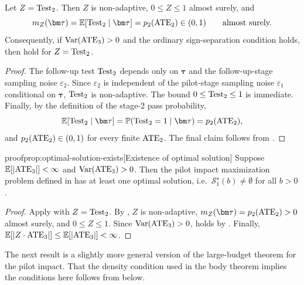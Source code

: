 \begin{lemma}
  \label{lem:test-two-satisfies-weighted-conditions-appendix}
  Let $Z=\operatorname{Test}_2$.
  Then $Z$ is non-adaptive, $0\le Z\le1$ almost surely, and
  \[
    m_Z(\bm\tau)
    =
    \E[\Test_2\mid\bm\tau]
    =
    p_2(\ATE_2)
    \in(0,1)
    \qquad\text{almost surely.}
  \]
  Consequently, if ${\rm Var}(\mathrm{ATE}_3)>0$ and the ordinary sign-separation condition  holds, then  hold for $Z=\operatorname{Test}_2$.
\end{lemma}

\begin{proof}
  The follow-up test $\operatorname{Test}_2$ depends only on $\bm\tau$ and the follow-up-stage sampling noise $\varepsilon_2$.
  Since $\varepsilon_2$ is independent of the pilot-stage sampling noise $\varepsilon_1$ conditional on $\bm\tau$, $\operatorname{Test}_2$ is non-adaptive.
  The bound $0\le\operatorname{Test}_2\le1$ is immediate.
  Finally, by the definition of the stage-2 pass probability,
  \[
    \E[\Test_2\mid\bm\tau]
    =
    \P(\Test_2=1\mid\bm\tau)
    =
    p_2(\ATE_2),
  \]
  and $p_2(\mathrm{ATE}_2)\in(0,1)$ for every finite $\mathrm{ATE}_2$.
  The final claim follows from .
\end{proof}

\begin{linkedresult}{proof}{prop:optimal-solution-exists}[Existence of optimal solution]
  \label{prop:optimal-solution-exists-appendix}
  Suppose $\mathbb{E}[|\mathrm{ATE}_3|]<\infty$ and ${\rm Var}(\mathrm{ATE}_3)>0$.
  Then the pilot impact maximization problem defined in  has at least one optimal solution, i.e.\ $\mathcal S_1^\star(b)\neq\emptyset$ for all $b>0$.
\end{linkedresult}

\begin{proof}
  Apply  with $Z=\operatorname{Test}_2$.
  By , $Z$ is non-adaptive, $m_Z(\bm\tau)=p_2(\ATE_2)>0$ almost surely, and $0\le Z\le1$.
  Since ${\rm Var}(\mathrm{ATE}_3)>0$,  holds by .
  Finally, $\mathbb{E}[|Z \cdot \mathrm{ATE}_3|]\le\mathbb{E}[|\mathrm{ATE}_3|]<\infty$.
\end{proof}

The next result is a slightly more general version of the large-budget theorem for the pilot impact.
That the density condition used in the body theorem implies the conditions here follows from  below.

